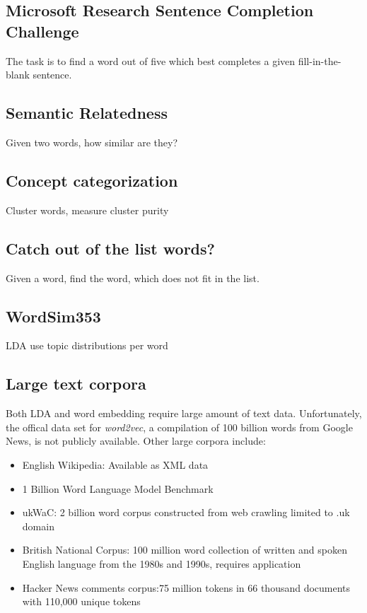 \documentclass{sig-alternate-05-2015}
\begin{document}
\subsection{Microsoft Research Sentence Completion Challenge}
The task is to find a word out of five which best completes a given fill-in-the-blank sentence.
\subsection{Semantic Relatedness}
Given two words, how similar are they?
\subsection{Concept categorization}
Cluster words, measure cluster purity

\subsection{Catch out of the list words?}
Given a word, find the word, which does not fit in the list.  %
\subsection{WordSim353}
LDA use topic distributions per word
\subsection{Large text corpora}
Both LDA and word embedding require large amount of text data.
Unfortunately, the offical data set for \emph{word2vec}, a compilation of 100 billion words from Google News, is not publicly available.
Other large corpora include:
\begin{itemize}
       \item
              English Wikipedia: Available as XML data
       \item
              1 Billion Word Language Model Benchmark
       \item
              ukWaC: 2 billion word corpus constructed from web crawling limited to .uk domain
       \item
              British National Corpus: 100 million word collection of written and spoken English language from the 1980s and 1990s, requires application
       \item
              Hacker News comments corpus:75 million tokens in 66 thousand documents with 110,000 unique tokens
\end{itemize}






\end{document}
